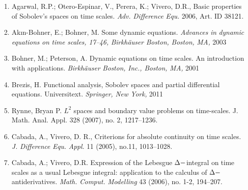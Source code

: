 \documentclass[12pt,a4paper,oneside,titlepage]{article}
\begin{document}
\begin{enumerate}
\item 
\label{Agarwal}
Agarwal, R.P.; Otero-Espinar, V., Perera, K.; Vivero, D.R., Basic properties of Sobolev's spaces on time scales. \textit{Adv. Difference Equ.} 2006, Art. ID 38121.
\item 
\label{Bohner_1}
Akın-Bohner, E.; Bohner, M. Some dynamic equations. \textit{Advances in dynamic equations on time scales, 17--46, Birkhäuser Boston, Boston, MA,} 2003
\item 
\label{Bohner_2}
Bohner, M.; Peterson, A. Dynamic equations on time scales. An introduction with applications. \textit{Birkhäuser Boston, Inc., Boston, MA,} 2001
\item 
\label{Brezis}
Brezis, H. Functional analysis, Sobolev spaces and partial differential equations. Universitext. \textit{Springer, New York,} 2011
\item
\label{Rynne}
Rynne, Bryan P. $L^2$ spaces and boundary value problems on time-scales. J. Math. Anal. Appl. 328 (2007), no. 2, 1217--1236.
\item
\label{Cabada_criterions}
 Cabada, A., Vivero, D. R., Criterions for absolute continuity on time scales.\textit{ J. Difference Equ. Appl.} 11 (2005), no.11, 1013--1028.
\item 
\label{Cabada_expressions}
Cabada, A.; Vivero, D.R. Expression of the Lebesgue $\Delta \-- $integral on time scales as a usual Lebesgue integral: application to the calculus of $\Delta \-- $antiderivatives. \textit{Math. Comput. Modelling }43 (2006), no. 1-2, 194--207. 


\end{enumerate}
\end{document}
